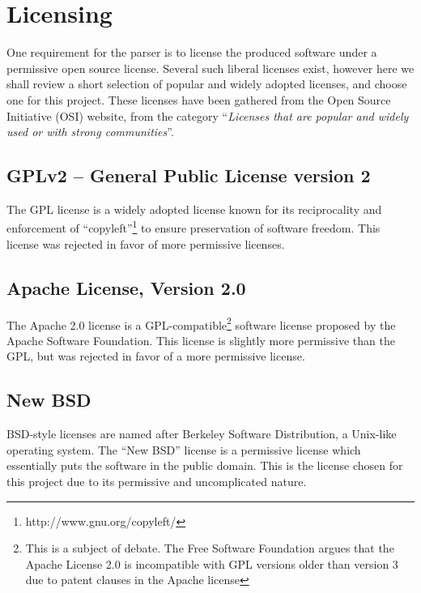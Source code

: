 \section{Licensing}
\label{sect:method:licensing}
One requirement for the parser is to license the produced software under a
permissive open source license. Several such liberal licenses exist, however here we
shall review a short selection of popular and widely adopted licenses, and
choose one for this project. These licenses have been gathered from the Open
Source Initiative (OSI) website\cite{osi_website}, from the category
``\emph{Licenses that are popular and widely used or with strong communities}''.

\subsection*{GPLv2 -- General Public License version 2}
The GPL license is a widely adopted license known for its reciprocality and
enforcement of ``copyleft''\footnote{http://www.gnu.org/copyleft/} to ensure
preservation of software freedom. This license was rejected in favor of more
permissive licenses.

\subsection*{Apache License, Version 2.0}
The Apache 2.0 license is a GPL-compatible\footnote{This is a subject of debate.
The Free Software Foundation argues\cite{fsf_licenses} that the Apache License
2.0 is incompatible  with GPL versions older than version 3 due to patent
clauses in the Apache license} software license proposed by the Apache Software
Foundation. This license is slightly more permissive than the GPL, but was
rejected in favor of a more permissive license. 

\subsection*{New BSD}
BSD-style licenses are named after Berkeley Software Distribution, a Unix-like
operating system. The ``New BSD'' license is a permissive license which
essentially puts the software in the public domain. This is the license chosen
for this project due to its permissive and uncomplicated nature.
